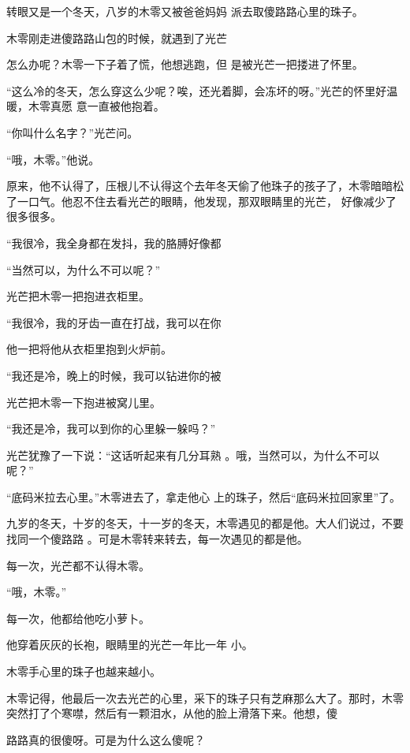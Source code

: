 \documentclass{article}
\begin{document}
转眼又是一个冬天，八岁的木零又被爸爸妈妈
派去取傻路路心里的珠子。 

木零刚走进傻路路山包的时候，就遇到了光芒
\newpage


怎么办呢？木零一下子着了慌，他想逃跑，但
是被光芒一把搂进了怀里。 

“这么冷的冬天，怎么穿这么少呢？唉，还光着脚，会冻坏的呀。”光芒的怀里好温暖，木零真愿
意一直被他抱着。 


“你叫什么名字？”光芒问。 



“哦，木零。”他说。 

原来，他不认得了，压根儿不认得这个去年冬天偷了他珠子的孩子了，木零暗暗松了一口气。他忍不住去看光芒的眼睛，他发现，那双眼睛里的光芒，
好像减少了很多很多。 

“我很冷，我全身都在发抖，我的胳膊好像都


\newpage

“当然可以，为什么不可以呢？” 


光芒把木零一把抱进衣柜里。 

“我很冷，我的牙齿一直在打战，我可以在你



他一把将他从衣柜里抱到火炉前。 

“我还是冷，晚上的时候，我可以钻进你的被



光芒把木零一下抱进被窝儿里。 

“我还是冷，我可以到你的心里躲一躲吗？”

光芒犹豫了一下说：“这话听起来有几分耳熟
。哦，当然可以，为什么不可以呢？” 

“底码米拉去心里。”木零进去了，拿走他心
上的珠子，然后“底码米拉回家里”了。 

\newpage

九岁的冬天，十岁的冬天，十一岁的冬天，木零遇见的都是他。大人们说过，不要找同一个傻路路
。可是木零转来转去，每一次遇见的都是他。 


每一次，光芒都不认得木零。 




“哦，木零。” 


每一次，他都给他吃小萝卜。 

他穿着灰灰的长袍，眼睛里的光芒一年比一年
小。 


木零手心里的珠子也越来越小。 

木零记得，他最后一次去光芒的心里，采下的珠子只有芝麻那么大了。那时，木零突然打了个寒噤，然后有一颗泪水，从他的脸上滑落下来。他想，傻

\newpage
路路真的很傻呀。可是为什么这么傻呢？ 
\end{document}
